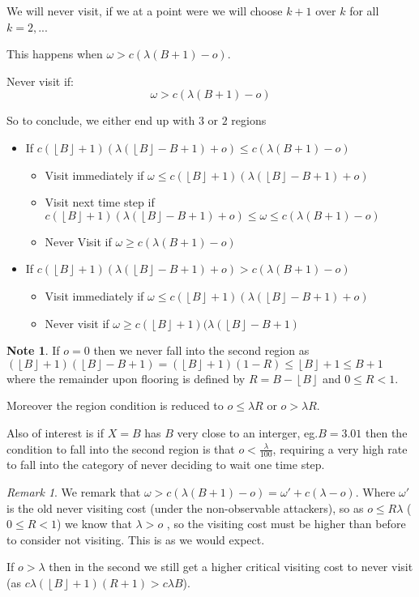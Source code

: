 \documentclass[a4paper,10pt]{article}
\newcommand{\floor}[1]{\left \lfloor #1 \right \rfloor}
\theoremstyle{definition}
\theoremstyle{definition}
\theoremstyle{remark}
\newtheorem*{remark}{Remark}
\theoremstyle{definition}
\newtheorem*{note}{Note}
\begin{document}
We will never visit, if we at a point were we will choose $k+1$ over $k$ for all $k=2,..$.

This happens when $\omega > c(\lambda (B+1) -o)$.

Never visit if:
\begin{equation}
\omega > c(\lambda (B+1) -o)
\end{equation}

So to conclude, we either end up with $3$ or $2$ regions
\begin{itemize}
\item If $c(\floor{B}+1)(\lambda (\floor{B}-B+1) +o) \leq c (\lambda (B+1) - o)$
 \begin{itemize}
 \item Visit immediately if $\omega \leq c (\floor{B}+1) (\lambda (\floor{B}-B+1) +o)$
 \item Visit next time step if $c(\floor{B}+1)(\lambda (\floor{B}-B+1) +o) \leq \omega \leq c (\lambda (B+1) - o)$
 \item Never Visit if $\omega \geq c(\lambda (B+1) -o)$
 \end{itemize}
\item If $c(\floor{B}+1)(\lambda (\floor{B}-B+1) +o) > c (\lambda (B+1) - o)$
 \begin{itemize}
 \item Visit immediately if $\omega \leq c (\floor{B}+1) (\lambda (\floor{B}-B+1) +o)$
 \item Never visit if $\omega \geq c (\floor{B}+1) (\lambda (\floor{B}-B+1)$
 \end{itemize}
\end{itemize}

\begin{note}
If $o=0$ then we never fall into the second region as $(\floor{B}+1)(\floor{B}-B+1)=(\floor{B}+1)(1-R) \leq \floor{B}+1 \leq B+1$ where the remainder upon flooring is defined by $R=B-\floor{B}$ and $0 \leq R < 1$.

Moreover the region condition is reduced to $o \leq \lambda R$ or $o > \lambda R$.
\end{note}

Also of interest is if $X=B$ has $B$ very close to an interger, eg.$B=3.01$ then the condition to fall into the second region is that $o < \frac{\lambda}{100}$, requiring a very high rate to fall into the category of never deciding to wait one time step.

\begin{remark}
We remark that $\omega > c (\lambda(B+1)-o )=\omega' + c(\lambda -o)$. Where $\omega'$ is the old never visiting cost (under the non-observable attackers), so as $o \leq R \lambda$ ($0 \leq R < 1$) we know that $\lambda > o$ , so the visiting cost must be higher than before to consider not visiting. This is as we would expect.

If $o > \lambda$ then in the second we still get a higher critical visiting cost to never visit (as $c \lambda (\floor{B}+1)(R+1) > c \lambda B$).
\end{remark}
\end{document}
